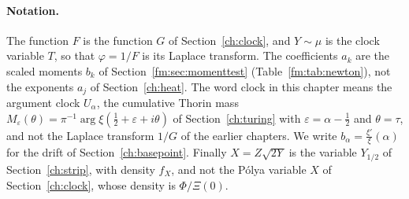 \paragraph{Notation.} The function $F$ is the function $G$ of Section~\ref{ch:clock}, and $Y\sim\mu$ is the clock variable $T$, so that $\varphi=1/F$ is its Laplace transform. The coefficients $a_k$ are the scaled moments $b_k$ of Section~\ref{fm:sec:momenttest} (Table~\ref{fm:tab:newton}), not the exponents $a_j$ of Section~\ref{ch:heat}. The word clock in this chapter means the argument clock $U_\alpha$, the cumulative Thorin mass $M_\varepsilon(\theta)=\pi^{-1}\arg\xi(\frac12+\varepsilon+i\theta)$ of Section~\ref{ch:turing} with $\varepsilon=\alpha-\frac12$ and $\theta=\tau$, and not the Laplace transform $1/G$ of the earlier chapters. We write $b_\alpha=\frac{\xi'}{\xi}(\alpha)$ for the drift of Section~\ref{ch:basepoint}. Finally $X=Z\sqrt{2Y}$ is the variable $Y_{1/2}$ of Section~\ref{ch:strip}, with density $f_X$, and not the P\'olya variable $X$ of Section~\ref{ch:clock}, whose density is $\Phi/\Xi(0)$.
